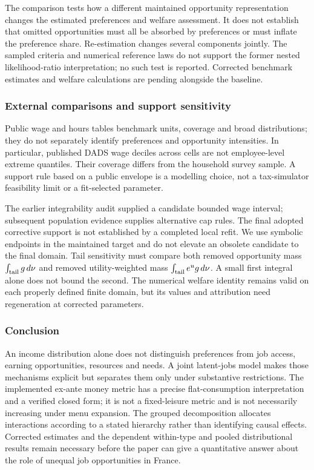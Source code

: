 \documentclass[11pt,a4paper]{article}
\begin{document}
The comparison tests how a different maintained opportunity representation changes the estimated preferences and welfare assessment. It does not establish that omitted opportunities must all be absorbed by preferences or must inflate the preference share. Re-estimation changes several components jointly. The sampled criteria and numerical reference laws do not support the former nested likelihood-ratio interpretation; no such test is reported. Corrected benchmark estimates and welfare calculations are pending alongside the baseline.

\subsubsection{External comparisons and support sensitivity}\label{external-comparisons-and-support-sensitivity}

Public wage and hours tables benchmark units, coverage and broad distributions; they do not separately identify preferences and opportunity intensities. In particular, published DADS wage deciles across cells are not employee-level extreme quantiles. Their coverage differs from the household survey sample. A support rule based on a public envelope is a modelling choice, not a tax-simulator feasibility limit or a fit-selected parameter.

The earlier integrability audit supplied a candidate bounded wage interval; subsequent population evidence supplies alternative cap rules. The final adopted corrective support is not established by a completed local refit. We use symbolic endpoints in the maintained target and do not elevate an obsolete candidate to the final domain. Tail sensitivity must compare both removed opportunity mass \(\int_{\rm tail}g\,d\nu\) and removed utility-weighted mass \(\int_{\rm tail}e^ug\,d\nu\). A small first integral alone does not bound the second. The numerical welfare identity remains valid on each properly defined finite domain, but its values and attribution need regeneration at corrected parameters.

\subsubsection{Conclusion}\label{conclusion}

An income distribution alone does not distinguish preferences from job access, earning opportunities, resources and needs. A joint latent-jobs model makes those mechanisms explicit but separates them only under substantive restrictions. The implemented ex-ante money metric has a precise flat-consumption interpretation and a verified closed form; it is not a fixed-leisure metric and is not necessarily increasing under menu expansion. The grouped decomposition allocates interactions according to a stated hierarchy rather than identifying causal effects. Corrected estimates and the dependent within-type and pooled distributional results remain necessary before the paper can give a quantitative answer about the role of unequal job opportunities in France.
\end{document}
